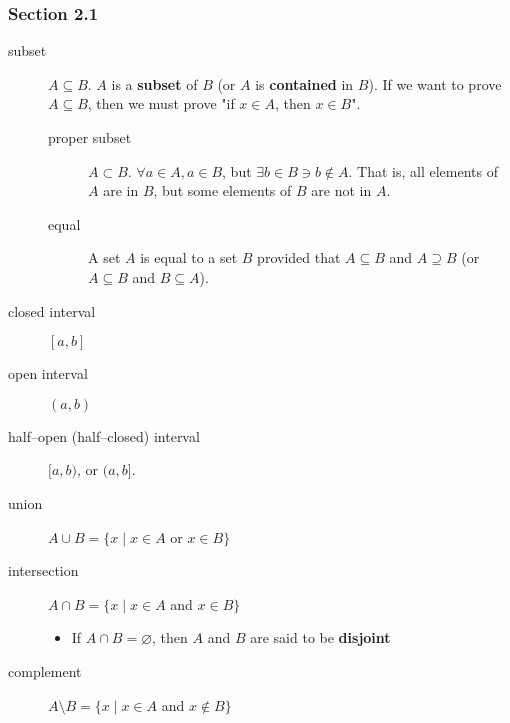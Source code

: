 \documentclass[12pt]{article}
\newcommand\sube{\subseteq}
\newcommand\supe{\supseteq}
\newcommand\sub{\subset}
\begin{document}
\subsubsection{Section 2.1}
\label{sec:org84bd693}
\begin{description}
\item[{subset}] \(A\sube{}B\). \(A\) is a \textbf{subset} of \(B\) (or \(A\) is \textbf{contained} in \(B\)). If we
want to prove \(A\sube{}B\), then we must prove "if \(x\in{}A\), then \(x\in{}B\)".
\begin{description}
\item[{proper subset}] \(A\sub{}B\). \(\forall{}a\in{}A, a\in{}B\), but \(\exists{}b\in{}B\ni{}b\notin{}A\). That is, all elements
of \(A\) are in \(B\), but some elements of \(B\) are not in \(A\).
\item[{equal}] A set \(A\) is equal to a set \(B\) provided that \(A\sube{}B\) and \(A\supe{}B\) (or
\(A\sube{}B\) and \(B\sube{}A\)).
\end{description}
\item[{closed interval}] \([a,b]\)
\item[{open interval}] \((a,b)\)
\item[{half--open (half--closed) interval}] \([a,b)\), or \((a,b]\).
\item[{union}] \(A\cup{}B=\{x\mid{}x\in{}A\) or \(x\in{}B\}\)
\item[{intersection}] \(A\cap{}B=\{x\mid{}x\in{}A\) and \(x\in{}B\}\)
\begin{itemize}
\item If \(A\cap{}B=\varnothing\), then \(A\) and \(B\) are said to be \textbf{disjoint}
\end{itemize}
\item[{complement}] \(A\setminus{}B=\{x\mid{}x\in{}A\) and \(x\notin{}B\}\)
\end{description}
\end{document}
